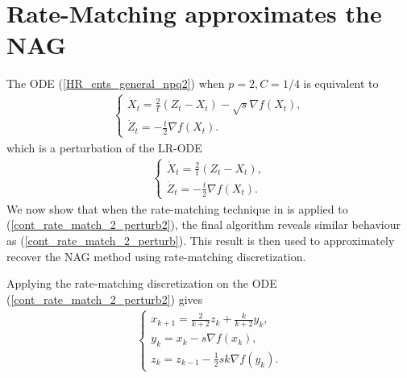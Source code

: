 \documentclass{article}
\theoremstyle{plain}
\theoremstyle{definition}
\theoremstyle{remark}
\begin{document}
\section{Rate-Matching approximates the NAG}\label{section4}
The ODE (\ref{HR_cnts_general_npq2}) when \(p=2,C=1/4\) is equivalent to
\begin{align}\label{cont_rate_match_2_perturb}
    \left\{\begin{array}{l}
         \dot X_t = \frac{2}{t}(Z_t-X_t)-\sqrt{s}\nabla f(X_t),  \\
          \dot Z_t = -\frac{t}{2}\nabla f(X_t).
    \end{array}
    \right.
\end{align}
which is a perturbation of the LR-ODE
\begin{align}\label{cont_rate_match_2_perturb2}
    \left\{\begin{array}{l}
         \dot X_t = \frac{2}{t}(Z_t-X_t),  \\
          \dot Z_t = -\frac{t}{2}\nabla f(X_t).
    \end{array}
    \right.
\end{align}
We now show that when the rate-matching technique in \citep{WibisonoE7351} is applied to (\ref{cont_rate_match_2_perturb2}), the final algorithm reveals similar behaviour as (\ref{cont_rate_match_2_perturb}). This result is then used to approximately recover the NAG method using rate-matching discretization. \par
  Applying the rate-matching discretization on the ODE (\ref{cont_rate_match_2_perturb2}) gives
\begin{align}\label{rate_match_2}
    \left\{\begin{array}{l}
    x_{k+1}=\frac{2}{k+2}z_k+\frac{k}{k+2}y_k,\\
    y_{k}=x_k-s\nabla f(x_k),   \\
    z_{k}=z_{k-1} -\tfrac{1}{2}s k\nabla f(y_k)  .    
    \end{array}\right.
\end{align}
\end{document}
